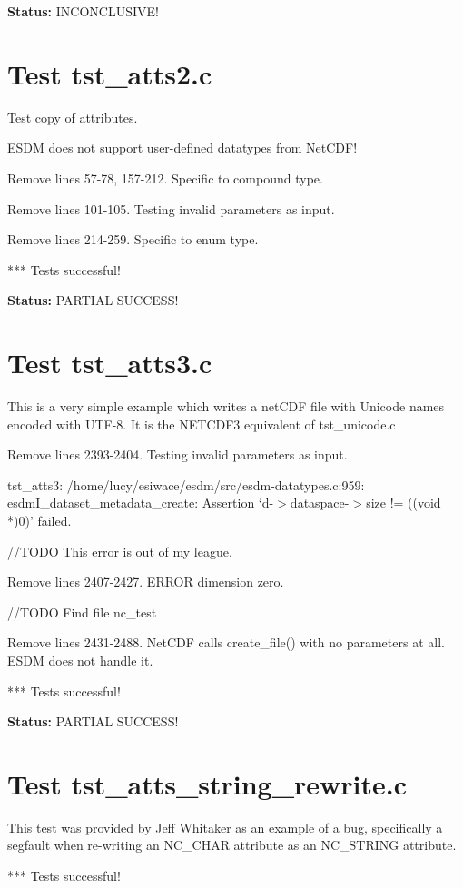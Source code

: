 {\bf \large Status: } INCONCLUSIVE!

\section{Test tst\_atts2.c}

Test copy of attributes.

ESDM does not support user-defined datatypes from NetCDF!

Remove lines 57-78, 157-212. Specific to compound type.

Remove lines 101-105. Testing invalid parameters as input.

Remove lines 214-259. Specific to enum type.

*** Tests successful!

{\bf \large Status: } PARTIAL SUCCESS!

\section{Test tst\_atts3.c}

This is a very simple example which writes a netCDF file with
Unicode names encoded with UTF-8. It is the NETCDF3 equivalent
of tst\_unicode.c

Remove lines 2393-2404. Testing invalid parameters as input.

tst\_atts3: /home/lucy/esiwace/esdm/src/esdm-datatypes.c:959: esdmI\_dataset\_metadata\_create: Assertion `d-$>$dataspace-$>$size != ((void *)0)' failed.

//TODO This error is out of my league.

Remove lines 2407-2427. ERROR dimension zero.

//TODO Find file nc\_test

Remove lines 2431-2488. NetCDF calls create\_file() with no parameters at all. ESDM does not handle it.

*** Tests successful!

{\bf \large Status: } PARTIAL SUCCESS!

\section{Test tst\_atts\_string\_rewrite.c}

This test was provided by Jeff Whitaker as an example of a bug,
specifically a segfault when re-writing an NC\_CHAR attribute as
an NC\_STRING attribute.

*** Tests successful!

